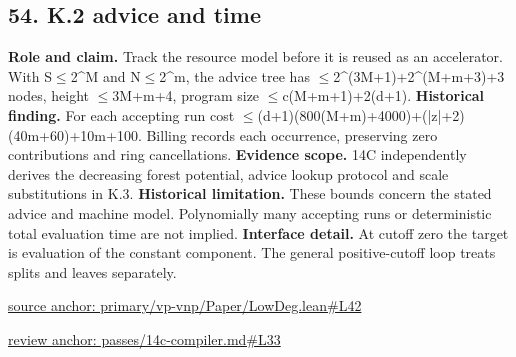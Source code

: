 \documentclass[11pt,letterpaper]{article}
\theoremstyle{definition}\newtheorem{definition}[theorem]{Definition}\newtheorem{example}[theorem]{Example}
\theoremstyle{remark}\newtheorem{remark}[theorem]{Remark}
\begin{document}
\subsection*{54. K.2 advice and time}
\textbf{Role and claim.} Track the resource model before it is reused as an accelerator. With S\ensuremath{\le}2\textasciicircum{}M and N\ensuremath{\le}2\textasciicircum{}m, the advice tree has \ensuremath{\le}2\textasciicircum{}(3M+1)+2\textasciicircum{}(M+m+3)+3 nodes, height \ensuremath{\le}3M+m+4, program size \ensuremath{\le}c(M+m+1)+2(d+1).
\textbf{Historical finding.} For each accepting run cost \ensuremath{\le}(d+1)(800(M+m)+4000)+(|z|+2)(40m+60)+10m+100. Billing records each occurrence, preserving zero contributions and ring cancellations.
\textbf{Evidence scope.} 14C independently derives the decreasing forest potential, advice lookup protocol and scale substitutions in K.3.
\textbf{Historical limitation.} These bounds concern the stated advice and machine model. Polynomially many accepting runs or deterministic total evaluation time are not implied.
\textbf{Interface detail.} At cutoff zero the target is evaluation of the constant component. The general positive-cutoff loop treats splits and leaves separately.
\par\href{https://github.com/nousentllc/VP-VNP-Review/blob/8a7976933b6b2b4ffda1ad3a0dfb5fc6b6f023e8/primary/vp-vnp/Paper/LowDeg.lean\#L42}{source anchor: primary/vp-vnp/Paper/LowDeg.lean\#L42}
\par\href{https://github.com/nousentllc/VP-VNP-Review/blob/8a7976933b6b2b4ffda1ad3a0dfb5fc6b6f023e8/passes/14c-compiler.md\#L33}{review anchor: passes/14c-compiler.md\#L33}
\goodbreak
{}
\hypertarget{claim.55}{}
\end{document}
